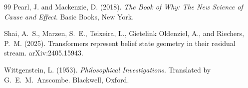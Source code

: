 \documentclass[12pt, a4paper]{article}
\theoremstyle{plain}
\theoremstyle{definition}
\theoremstyle{remark}
\begin{document}
\begin{thebibliography}{99}
Pearl, J. and Mackenzie, D. (2018). \textit{The Book of Why: The New Science
of Cause and Effect}. Basic Books, New York.

Shai, A.~S., Marzen, S.~E., Teixeira, L., Gietelink Oldenziel, A., and
Riechers, P.~M. (2025). Transformers represent belief state geometry in their
residual stream. arXiv:2405.15943.

Wittgenstein, L. (1953). \textit{Philosophical Investigations}. Translated
by G.~E.~M.\ Anscombe. Blackwell, Oxford.

\end{thebibliography}
\end{document}

